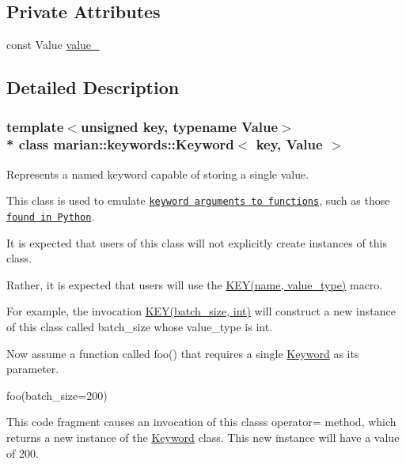 \subsection*{Private Attributes}
\begin{DoxyCompactItemize}
\item 
const Value \hyperlink{classmarian_1_1keywords_1_1Keyword_ab27c78201de04f55b9fd7be52d5b6d05}{value\+\_\+}
\end{DoxyCompactItemize}


\subsection{Detailed Description}
\subsubsection*{template$<$unsigned key, typename Value$>$\\*
class marian\+::keywords\+::\+Keyword$<$ key, Value $>$}

Represents a named keyword capable of storing a single value. 

This class is used to emulate \href{https://en.wikipedia.org/wiki/Named_parameter}{\tt keyword arguments to functions}, such as those \href{https://docs.python.org/3/tutorial/controlflow.html#keyword-arguments}{\tt found in Python}.

It is expected that users of this class will not explicitly create instances of this class.

Rather, it is expected that users will use the \hyperlink{keywords_8h_ad6c9fa5917736eee3d55706caf21469d}{K\+E\+Y(name, value\+\_\+type)} macro.

For example, the invocation {\ttfamily \hyperlink{keywords_8h_ad6c9fa5917736eee3d55706caf21469d}{K\+E\+Y(batch\+\_\+size, int)}} will construct a new instance of this class called {\ttfamily batch\+\_\+size} whose {\ttfamily value\+\_\+type} is {\ttfamily int}.

Now assume a function called {\ttfamily foo()} that requires a single \hyperlink{classmarian_1_1keywords_1_1Keyword}{Keyword} as its parameter.

{\ttfamily foo(batch\+\_\+size=200)}

This code fragment causes an invocation of this class\textquotesingle{}s operator= method, which returns a new instance of the \hyperlink{classmarian_1_1keywords_1_1Keyword}{Keyword} class. This new instance will have a value of 200. 

